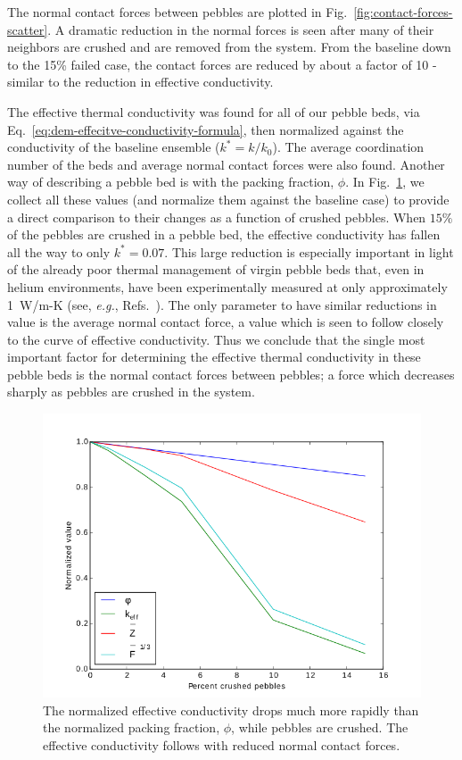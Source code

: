 The normal contact forces between pebbles are plotted in Fig.~\ref{fig:contact-forces-scatter}. A dramatic reduction in the normal forces is seen after many of their neighbors are crushed and are removed from the system. From the baseline down to the 15\% failed case, the contact forces are reduced by about a factor of 10 - similar to the reduction in effective conductivity.

The effective thermal conductivity was found for all of our pebble beds, via Eq.~\ref{eq:dem-effecitve-conductivity-formula}, then normalized against the conductivity of the baseline ensemble ($k^* = k/k_\text{0}$). The average coordination number of the beds and average normal contact forces were also found. Another way of describing a pebble bed is with the packing fraction, $\phi$. In Fig.~\ref{fig:packing-fraction}, we collect all these values (and normalize them against the baseline case) to provide a direct comparison to their changes as a function of crushed pebbles. When $15\%$ of the pebbles are crushed in a pebble bed, the effective conductivity has fallen all the way to only $k^*=0.07$. This large reduction is especially important in light of the already poor thermal management of virgin pebble beds that, even in helium environments, have been experimentally measured at only approximately 1~W/m-K (see, \textit{ e.g.}, Refs.~\cite{Reimann:2002mi, Piazza2002811}). The only parameter to have similar reductions in value is the average normal contact force, a value which is seen to follow closely to the curve of effective conductivity. Thus we conclude that the single most important factor for determining the effective thermal conductivity in these pebble beds is the normal contact forces between pebbles; a force which decreases sharply as pebbles are crushed in the system.

\begin{figure}[!ht]
	\centering
	\includegraphics[width=\singleimagewidth]{chapters/figures/kEff_packingFraction}
	\caption{The normalized effective conductivity drops much more rapidly than the normalized packing fraction, $\phi$, while pebbles are crushed. The effective conductivity follows with reduced normal contact forces.}
\label{fig:packing-fraction}
\end{figure}

